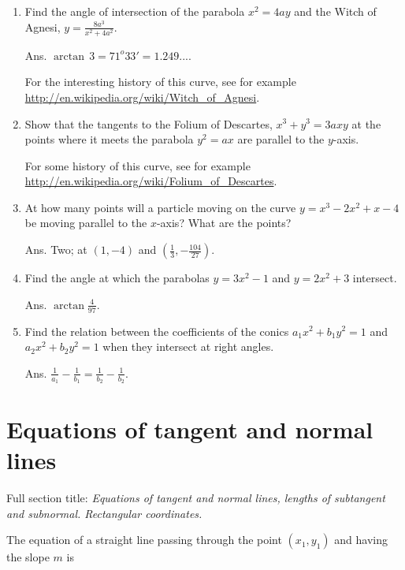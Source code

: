\begin{enumerate}
\item
Find the angle of intersection of the parabola 
$x^2 = 4ay$ and the Witch of Agnesi,
 $y = \frac{8a^3}{x^2 + 4a^2}$. 

Ans. $\arctan\, 3 = 71^o33' = 1.249...$.

For the interesting history of this curve, see for example
\newline
\url{http://en.wikipedia.org/wiki/Witch\_of\_Agnesi}.

\item
Show that the tangents to the Folium of Descartes,
$x^3 + y^3 = 3axy$ at the points where it meets the parabola 
$y^2 = ax$ are parallel to the %
$y$-axis.

For some
history of this curve, see for example
\newline
\url{http://en.wikipedia.org/wiki/Folium\_of\_Descartes}.

\item
At how many points will a particle moving on the curve 
$y = x^3 - 2x^2 + x - 4$ be moving parallel to the %
$x$-axis? What are the points? 

Ans. Two; at $(1,-4)$ and $(\frac{1}{3}, -\frac{104}{27})$.

\item
Find the angle at which the parabolas $y = 3x^2-1$ and 
$y = 2x^2 + 3$ intersect. 

Ans. $\arctan \frac{4}{97}$.

\item
Find the relation between the coefficients of the 
conics $a_1x^2 + b_1y^2 = 1$ and $a_2x^2 + b_2y^2 = 1$ when they 
intersect at right angles. 

Ans. $\frac{1}{a_1} - \frac{1}{b_1} = \frac{1}{b_2} - \frac{1}{b_2}$.

\end{enumerate}

\section{Equations of tangent and normal lines}
\label{sec:65}

Full section title: %
{\it Equations of tangent and normal lines, lengths of subtangent 
and subnormal. Rectangular coordinates.}

The equation of a straight line passing through the 
point $(x_1,y_1)$ and having the slope $m$ is

